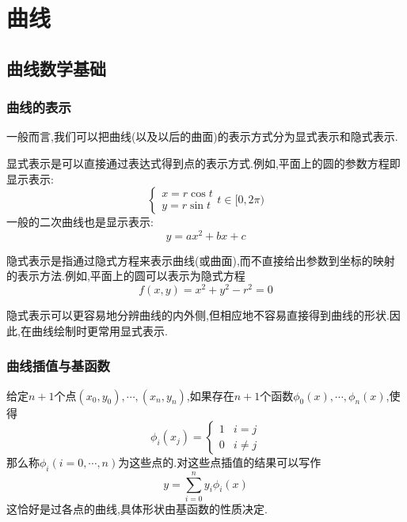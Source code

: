 \documentclass{ctexart}
\begin{document}
\section{曲线}
\subsection{曲线数学基础}
\subsubsection{曲线的表示}
一般而言,我们可以把曲线(以及以后的曲面)的表示方式分为显式表示和隐式表示.
\begin{definition}[显式表示]
    显式表示是可以直接通过表达式得到点的表示方式.例如,平面上的圆的参数方程即显示表示:
    \[\begin{cases}
        x=r\cos t\\
        y=r\sin t
    \end{cases}t\in[0,2\pi)\]
    一般的二次曲线也是显示表示:
    \[y=ax^2+bx+c\]
\end{definition}
\begin{definition}[隐式表示]
    隐式表示是指通过隐式方程来表示曲线(或曲面),而不直接给出参数到坐标的映射的表示方法.例如,平面上的圆可以表示为隐式方程
    \[f(x,y)=x^2+y^2-r^2=0\]
\end{definition}
隐式表示可以更容易地分辨曲线的内外侧,但相应地不容易直接得到曲线的形状.因此,在曲线绘制时更常用显式表示.
\subsubsection{曲线插值与基函数}
\begin{definition}[基函数]
    给定$n+1$个点$(x_0,y_0),\cdots,(x_n,y_n)$,如果存在$n+1$个函数$\phi_0(x),\cdots,\phi_n(x)$,使得
    \[\phi_i(x_j)=\begin{cases}
        1&i=j\\
        0&i\neq j
    \end{cases}\]
    那么称$\phi_i(i=0,\cdots,n)$为这些点的.对这些点插值的结果可以写作
    \[y=\sum_{i=0}^ny_i\phi_i(x)\]
    这恰好是过各点的曲线,具体形状由基函数的性质决定.
\end{definition}
\end{document}
